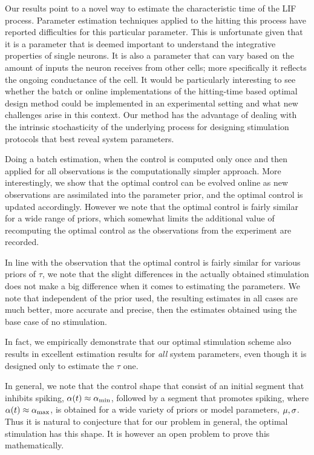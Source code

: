 \documentclass{article}
\begin{document}
Our results point to a novel way to estimate the characteristic time of the LIF
process. Parameter estimation techniques applied to the hitting this process
have reported difficulties for this particular parameter. This is unfortunate
given that it is a parameter that is deemed important to understand the
integrative properties of single neurons. It is also a parameter that can vary
based on the amount of inputs the neuron receives from other cells; more
specifically it reflects the ongoing conductance of the cell. It would be
particularly interesting to see whether the batch or online implementations of
the hitting-time based optimal design method could be implemented in an
experimental setting and what new challenges arise in this context. Our method
has the advantage of dealing with the intrinsic stochasticity of the underlying
process for designing stimulation protocols that best reveal system parameters.
 
Doing a batch estimation, when the control is computed only once and then
applied for all observations is the computationally simpler approach. More
interestingly, we show that the optimal control can be evolved online as
new observations are assimilated into the parameter prior, and the optimal
control is updated accordingly. However we note that the optimal control is
fairly similar for a wide range of priors, which somewhat limits the
additional value of recomputing the optimal control as the observations from
the experiment are recorded.

In line with the observation that the optimal control is fairly similar for
various priors of $\tau$, we note that the slight differences in the actually
obtained stimulation does not make a big difference when it comes to estimating
the parameters. We note that independent of the prior used, the resulting
estimates in all cases are much better, more accurate and precise, then the
estimates obtained using the base case of no stimulation. 

In fact, we empirically demonstrate that our optimal stimulation scheme also
results in excellent estimation results for {\sl all} system parameters, even
though it is designed only to estimate the $\tau$ one.

In general, we note that the control shape that consist of an initial segment
that inhibits spiking, ${\alpha}(t) \approx { {\alpha}_{\textrm{min}} }$, followed by a segment that
promotes spiking, where ${\alpha}(t) \approx { {\alpha}_{\textrm{max}} }$, is obtained for a wide variety of
priors or model parameters, ${\mu }, {\sigma }$. Thus it is natural to conjecture that for
our problem in general, the optimal stimulation has this shape. It is however an
open problem to prove this mathematically.
\end{document}
